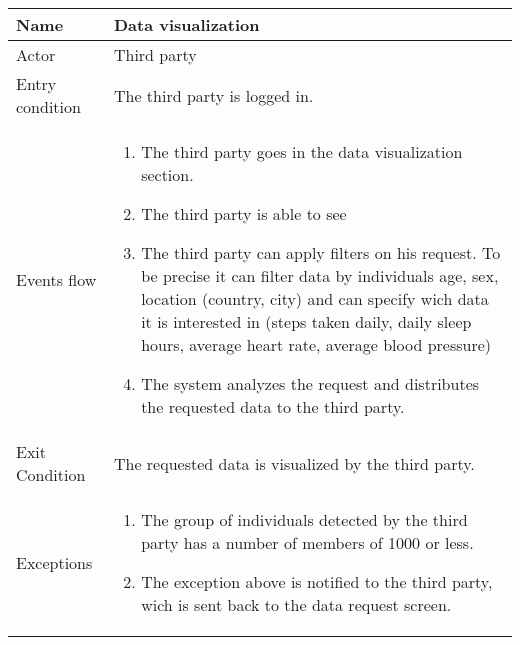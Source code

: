 \begin{tabular}{|l|p{13cm}|}
    \hline
    Name & Data visualization
    \\ \hline
    Actor & Third party
    \\ \hline 
    Entry condition & The third party is logged in.
        \\ \hline
    Events flow &
    \begin{enumerate}
    \item The third party goes in the data visualization section.
    \item The third party is able to see
	\item The third party can apply filters on his request. To be precise it can filter data by individuals age, sex, location (country, city) and can specify wich data it is interested in (steps taken daily, daily sleep hours, average heart rate, average blood pressure)
	\item The system analyzes the request and distributes the requested data to the third party.
    \end{enumerate}
     \\ \hline
     Exit Condition & The requested data is visualized by the third party.
     \\
    \hline
    Exceptions &
        \begin{enumerate}
    \item The group of individuals detected by the third party has a number of members of 1000 or less.
    \item The exception above is notified to the third party, wich is sent back to the data request screen.
    \end{enumerate} 
     \\
    \hline
\end{tabular}
  

